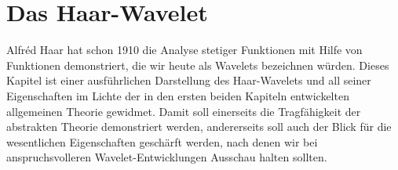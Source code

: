 %
%
%
\chapter{Das Haar-Wavelet
\label{chapter:haar-wavelet}}
Alfréd Haar hat schon 1910 die Analyse stetiger Funktionen mit Hilfe
von Funktionen demonstriert, die wir heute als Wavelets bezeichnen
würden.
Dieses Kapitel ist einer ausführlichen Darstellung des Haar-Wavelets
und all seiner Eigenschaften im Lichte der in den ersten beiden Kapiteln
entwickelten allgemeinen Theorie gewidmet.
Damit soll einerseits die Tragfähigkeit der abstrakten Theorie
demonstriert werden, andererseits soll auch der Blick für die
wesentlichen Eigenschaften geschärft werden, nach denen wir bei
anspruchsvolleren Wavelet-Entwicklungen Ausschau halten sollten.







